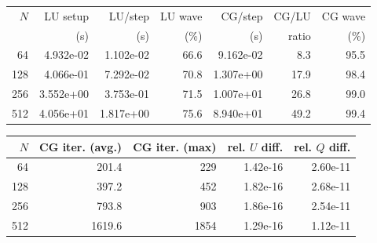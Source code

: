 \begin{tabular}{rrrrrrr}
\toprule
$N$ & LU setup & LU/step & LU wave & CG/step & CG/LU & CG wave \\
 & (s) & (s) & (\%) & (s) & ratio & (\%) \\
\midrule
64 & 4.932e-02 & 1.102e-02 & 66.6 & 9.162e-02 & 8.3 & 95.5 \\
128 & 4.066e-01 & 7.292e-02 & 70.8 & 1.307e+00 & 17.9 & 98.4 \\
256 & 3.552e+00 & 3.753e-01 & 71.5 & 1.007e+01 & 26.8 & 99.0 \\
512 & 4.056e+01 & 1.817e+00 & 75.6 & 8.940e+01 & 49.2 & 99.4 \\
\bottomrule
\end{tabular}
\par\medskip
\begin{tabular}{rrrrr}
\toprule
$N$ & CG iter. (avg.) & CG iter. (max) & rel. $U$ diff. & rel. $Q$ diff. \\
\midrule
64 & 201.4 & 229 & 1.42e-16 & 2.60e-11 \\
128 & 397.2 & 452 & 1.82e-16 & 2.68e-11 \\
256 & 793.8 & 903 & 1.86e-16 & 2.54e-11 \\
512 & 1619.6 & 1854 & 1.29e-16 & 1.12e-11 \\
\bottomrule
\end{tabular}

